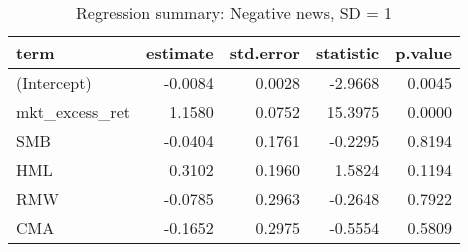 \begin{table}[H]
\centering
\caption{Regression summary: Negative news, SD = 1} 
\begin{tabular}{lrrrr}
  \hline
term & estimate & std.error & statistic & p.value \\ 
  \hline
(Intercept) & -0.0084 & 0.0028 & -2.9668 & 0.0045 \\ 
  mkt\_excess\_ret & 1.1580 & 0.0752 & 15.3975 & 0.0000 \\ 
  SMB & -0.0404 & 0.1761 & -0.2295 & 0.8194 \\ 
  HML & 0.3102 & 0.1960 & 1.5824 & 0.1194 \\ 
  RMW & -0.0785 & 0.2963 & -0.2648 & 0.7922 \\ 
  CMA & -0.1652 & 0.2975 & -0.5554 & 0.5809 \\ 
   \hline
\end{tabular}
\label{tab: summary_neg_1}
\end{table}

